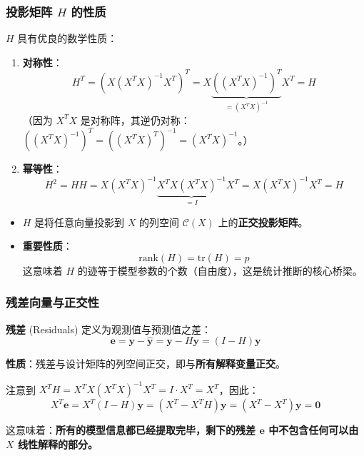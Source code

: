
\begin{frame}
\frametitle{投影矩阵 $H$ 的性质}

$H$ 具有优良的数学性质：

\begin{enumerate}
    \item \textbf{对称性}：
    \[
    H^T = (X (X^T X)^{-1} X^T)^T = X \underbrace{((X^T X)^{-1})^T}_{= (X^TX)^{-1}} X^T = H
    \]
    （因为 $X^TX$ 是对称阵，其逆仍对称：$((X^TX)^{-1})^T = ((X^TX)^T)^{-1} = (X^TX)^{-1}$。）

    \item \textbf{幂等性}：
    \[
    H^2 = H H = X (X^T X)^{-1} \underbrace{X^T X (X^T X)^{-1}}_{= I} X^T = X(X^TX)^{-1}X^T = H
    \]
\end{enumerate}

\begin{itemize}
    \item $H$ 是将任意向量投影到 $X$ 的列空间 $\mathcal{C}(X)$ 上的\textbf{正交投影矩阵}。
    \item \textbf{重要性质}：
    \[ \text{rank}(H) = \text{tr}(H) = p \]
    这意味着 $H$ 的迹等于模型参数的个数（自由度），这是统计推断的核心桥梁。
\end{itemize}
\end{frame}


\begin{frame}
\frametitle{残差向量与正交性}

\textbf{残差} (Residuals) 定义为观测值与预测值之差：
\[
\mathbf{e} = \mathbf{y} - \hat{\mathbf{y}} = \mathbf{y} - H\mathbf{y} = (I - H)\mathbf{y}
\]

\textbf{性质}：残差与设计矩阵的列空间正交，即与\textbf{所有解释变量正交}。

注意到 $X^T H = X^T X (X^T X)^{-1} X^T = I \cdot X^T = X^T$，因此：
\[
X^T \mathbf{e} = X^T (I - H)\mathbf{y} = (X^T - X^T H)\mathbf{y} = (X^T - X^T)\mathbf{y} = \mathbf{0}
\]

这意味着：\textbf{所有的模型信息都已经提取完毕，剩下的残差 $\mathbf{e}$ 中不包含任何可以由 $X$ 线性解释的部分。}
\end{frame}


